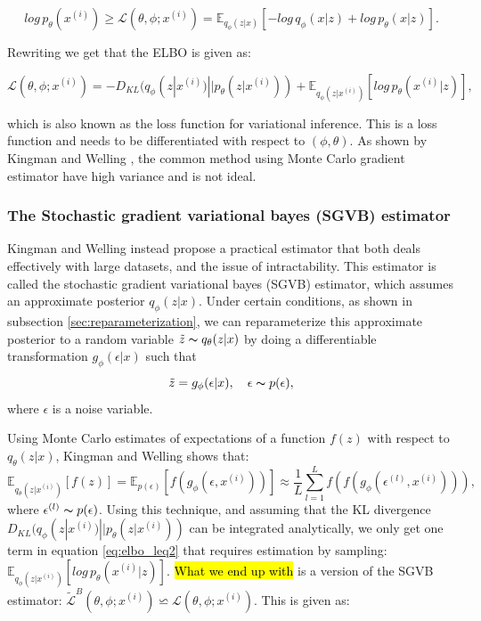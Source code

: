 \begin{equation}\label{eq:elbo_leq1}
    log\, p_{\theta}(x^{(i)}) \geq \mathcal{L}(\theta, \phi;x^{(i)}) = \mathbb{E}_{q_{\phi}(z|x)}[-log\, q_{\phi}(x|z)+log\, p_{\theta}(x|z)].
\end{equation}

Rewriting we get that the ELBO is given as:

\begin{equation}\label{eq:elbo_leq2}
    \mathcal{L}(\theta, \phi;x^{(i)}) =  - D_{KL}(q_{\phi}(z|x^{(i)})||p_{\theta}(z|x^{(i)})) + \mathbb{E}_{q_{\phi}(z|x^{(i)})}[log\, p_{\theta}(x^{(i)}|z)],
\end{equation}

which is also known as the loss function for variational inference. This is a loss function and needs to be differentiated with respect to 
$(\phi, \theta)$. As shown by Kingman and Welling \cite{VAE}, the common method using Monte Carlo gradient estimator have high variance 
and is not ideal. 

\subsubsection*{The Stochastic gradient variational bayes (SGVB) estimator}
Kingman and Welling \cite{VAE} instead propose a practical estimator that both deals effectively 
with large datasets, and the issue of intractability. This estimator is called the stochastic 
gradient variational bayes (SGVB) estimator, which assumes an approximate posterior 
$q_{\phi}(z|x)$. Under certain conditions, as shown in subsection \ref{sec:reparameterization}, 
we can reparameterize this approximate posterior to a random variable 
$\tilde{z} \thicksim q_{\theta}(z|x)$ by doing a differentiable transformation $g_{\phi}(\epsilon|x)$ such that 
\begin{equation*}
    \tilde{z} = g_{\phi}(\epsilon|x), \quad \epsilon \thicksim p(\epsilon),
\end{equation*}
where $\epsilon$ is a noise variable.\par 
Using Monte Carlo estimates of expectations of a function $f(z)$ with respect to $q_{\theta}(z|x)$,  Kingman and Welling \cite{VAE} shows that:
\begin{equation}
    \mathbb{E}_{q_{\theta}(z|x^{(i)})}[f(z)] = \mathbb{E}_{p(\epsilon)}[f(g_{\phi}(\epsilon, x^{(i)}))] \approx \frac{1}{L}\sum_{l=1}^{L}f(f(g_{\phi}(\epsilon^{(l)}, x^{(i)}))),
\end{equation}
where $\epsilon^{(l)} \thicksim p(\epsilon)$. Using this technique, and assuming that the KL divergence 
$D_{KL}(q_{\phi}(z|x^{(i)})||p_{\theta}(z|x^{(i)}))$ can be integrated analytically, we only get one term in 
equation \ref{eq:elbo_leq2} that requires estimation by sampling: $\mathbb{E}_{q_{\phi}(z|x^{(i)})}[log\, p_{\theta}(x^{(i)}|z)]$. 
\hl{What we end up with} is a version of the SGVB estimator: $\tilde{\mathcal{L}}^{B}(\theta, \phi; x^{(i)}) \backsimeq 
\mathcal{L}(\theta, \phi; x^{(i)})$. This is given as:

